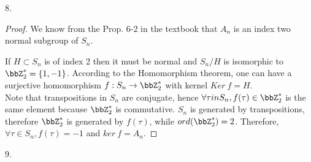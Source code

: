 \begin{exercise}
    8.
\end{exercise}

\begin{proof}
    We know from the Prop. 6-2 in the textbook that $A_n$ is an index two normal subgroup of $S_n$.

    If $H\subset S_n$ is of index 2 then it must be normal and $S_n/H$ is isomorphic to $\bbZ_2^*=\{1,-1\}$. According to the Homomorphism theorem, one can have a surjective homomorphism $f:S_n \rightarrow \bbZ_2^*$ with kernel $Ker\ f = H$. \\
    Note that transpositions in $S_n$ are conjugate, hence $\forall \tau in S_n, f(\tau)\in \bbZ_2^*$ is the same element because $\bbZ_2^*$ is commutative. $S_n$ is generated by transpositions, therefore $\bbZ_2^*$ is generated by $f(\tau)$, while $ord(\bbZ_2^*)=2$. Therefore, $\forall \tau\in S_n, f(\tau)=-1$ and $ker\ f =A_n$. 
\end{proof}

\begin{exercise}
    9.
\end{exercise}

